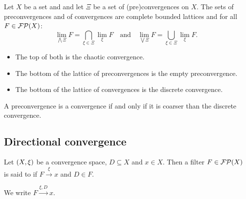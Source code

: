 \begin{proposition} \label{latticeConvergences}
Let $X$ be a set and and let $\Xi$ be a set of (pre)convergences on $X$. The sets of preconvergences and of convergences are complete bounded lattices and for all $F \in \operatorname{\mathcal{FP}}(X)$:
\[ \lim_{\bigwedge \Xi} F = \bigcap_{\xi\in\Xi}\lim_\xi F \quad\text{and}\quad \lim_{\bigvee \Xi} F = \bigcup_{\xi\in\Xi}\lim_\xi F. \]
\begin{itemize}
\item The top of both is the chaotic convergence.
\item The bottom of the lattice of preconvergences is the empty preconvergence.
\item The bottom of the lattice of convergences is the discrete convergence.
\end{itemize}
\end{proposition}

\begin{lemma}
A preconvergence is a convergence \textup{if and only if} it is coarser than the discrete convergence.
\end{lemma}

\subsection{Directional convergence}
\begin{definition}
Let $\left( X,\xi \right)$ be a convergence space, $D\subseteq X$ and $x\in X$. Then a filter $F\in \operatorname{\mathcal{FP}}(X)$ is said to  if $F\overset{\xi}{\longrightarrow} x$ and $D\in F$.

We write $F\overset{\xi, D}{\longrightarrow} x$.
\end{definition}

